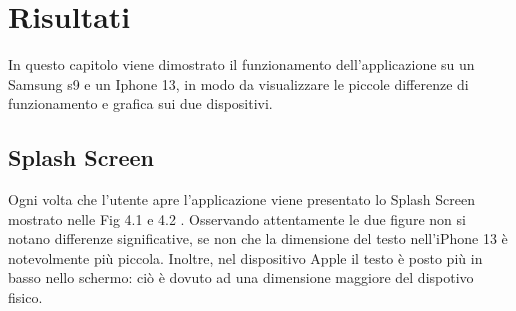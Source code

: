 \chapter{Risultati}
In questo capitolo viene dimostrato il funzionamento dell'applicazione su un Samsung s9 e un Iphone 13, in modo da visualizzare le piccole 
differenze di funzionamento e grafica sui due dispositivi.
\section*{Splash Screen}
Ogni volta che l'utente apre l'applicazione viene presentato lo Splash Screen mostrato nelle Fig 4.1 e 4.2 . Osservando attentamente le due figure non si notano differenze significative, se non che la dimensione del testo nell'iPhone 13 \`e notevolmente pi\`u piccola.
Inoltre, nel dispositivo Apple il testo \`e posto pi\`u in basso nello schermo: ci\`o \`e  dovuto ad una dimensione maggiore del dispotivo fisico.

